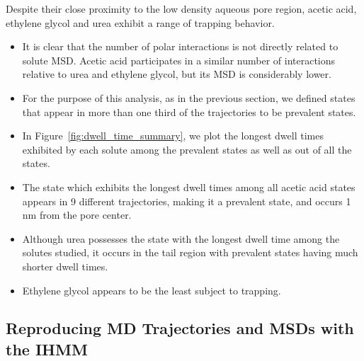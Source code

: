 \documentclass{article}
\begin{document}
  Despite their close proximity to the low density aqueous pore region, acetic
  acid, ethylene glycol and urea exhibit a range of trapping behavior.
  \begin{itemize}
    \item It is clear that the number of polar interactions is not directly
    related to solute MSD. Acetic acid participates in a similar number of 
    interactions relative to urea and ethylene glycol, but its MSD is considerably
    lower.
    \item For the purpose of this analysis, as in the previous section, we 
    defined states that appear in more than one third of the trajectories to
    be prevalent states.
    \item In Figure~\ref{fig:dwell_time_summary}, we plot the longest dwell
    times exhibited by each solute among the prevalent states as well 
    as out of all the states.
    \item The state which exhibits the longest dwell times among all acetic
    acid states appears in 9 different trajectories, making it a prevalent state,
    and occurs 1 nm from the pore center. %
    \item Although urea possesses the state with the longest dwell time among the
    solutes studied, it occurs in the tail region with prevalent states having 
    much shorter dwell times.  %
    \item Ethylene glycol appears to be the least subject to trapping.
  \end{itemize}


  \subsection{Reproducing MD Trajectories and MSDs with the IHMM}
  
  
\end{document}
